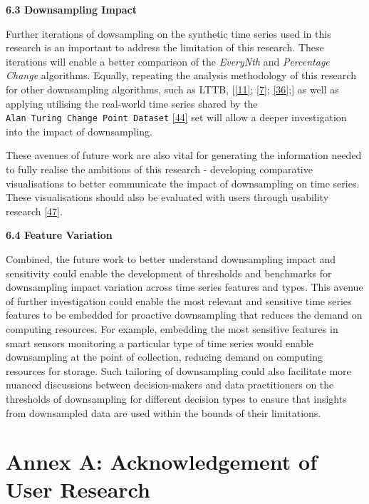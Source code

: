 \documentclass{article}
\begin{document}
\textbf{6.3 Downsampling Impact}

Further iterations of dowsampling on the synthetic time series used in
this research is an important to address the limitation of this
research. These iterations will enable a better comparison of the
\emph{EveryNth} and \emph{Percentage Change} algorithms. Equally,
repeating the analysis methodology of this research for other
downsampling algorithms, such as LTTB,
{[}\protect\hyperlink{ref-Sveinn}{{[}11{]}};
\protect\hyperlink{ref-MinMaxLTTB}{{[}7{]}};
\protect\hyperlink{ref-MinMaxOrdered}{{[}36{]}};{]} as well as applying
utilising the real-world time series shared by the
\texttt{Alan\ Turing\ Change\ Point\ Dataset}
\protect\hyperlink{ref-ATIChangePoint}{{[}44{]}} set will allow a deeper
investigation into the impact of downsampling.

These avenues of future work are also vital for generating the
information needed to fully realise the ambitions of this research -
developing comparative visualisations to better communicate the impact
of downsampling on time series. These visualisations should also be
evaluated with users through usability research
\protect\hyperlink{ref-graphsampling}{{[}47{]}}.

\textbf{6.4 Feature Variation}

Combined, the future work to better understand downsampling impact and
sensitivity could enable the development of thresholds and benchmarks
for downsampling impact variation across time series features and types.
This avenue of further investigation could enable the most relevant and
sensitive time series features to be embedded for proactive downsampling
that reduces the demand on computing resources. For example, embedding
the most sensitive features in smart sensors monitoring a particular
type of time series would enable downsampling at the point of
collection, reducing demand on computing resources for storage. Such
tailoring of downsampling could also facilitate more nuanced discussions
between decision-makers and data practitioners on the thresholds of
downsampling for different decision types to ensure that insights from
downsampled data are used within the bounds of their limitations.

\newpage

\hypertarget{annex-a-acknowledgement-of-user-research}{%
\section{Annex A: Acknowledgement of User
Research}\label{annex-a-acknowledgement-of-user-research}}
\end{document}
